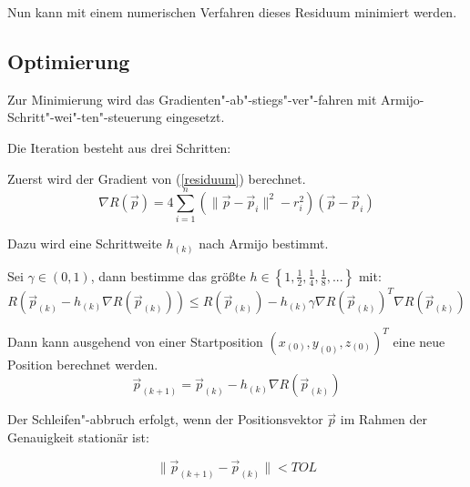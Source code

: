 \documentclass[ngerman,paper=a4,11pt]{scrartcl}
\begin{document}
Nun kann mit einem numerischen Verfahren dieses Residuum minimiert werden.

\subsection{Optimierung}

Zur Minimierung wird das Gradienten"-ab"-stiegs"-ver"-fahren mit Armijo-Schritt"-wei"-ten"-steuerung eingesetzt.


Die Iteration besteht aus drei Schritten:

Zuerst wird der Gradient von (\ref{residuum}) berechnet.
\begin{equation}
\nabla R(\vec{p}) =4 \sum\limits_{i=1}^n \left(\lVert \vec{p}-\vec{p}_i \rVert ^2 - r_i^ 2 \right) (\vec{p}-\vec{p}_i)
\end{equation}

Dazu wird eine Schrittweite $h_{(k)}$ nach Armijo bestimmt.

Sei $\gamma \in (0,1)$, dann bestimme das größte $h \in \left\lbrace1,\frac{1}{2},\frac{1}{4},\frac{1}{8},... \right\rbrace$ 
mit:
\begin{equation}
R\left(\vec{p}_{(k)} - h_{(k)} \nabla R\left(\vec{p}_{(k)}\right)\right) \leq R\left(\vec{p}_{(k)}\right) - h_{(k)} \gamma \nabla R\left(\vec{p}_{(k)}\right)^ T \nabla R\left(\vec{p}_{(k)}\right)
\end{equation}


Dann kann ausgehend von einer Startposition $(x_{(0)},y_{(0)}, z_{(0)})^ T$ eine neue 
Position berechnet werden.
\begin{equation}
\vec{p}_{(k+1)} = \vec{p}_{(k)} - h_{(k)} \nabla R(\vec{p}_{(k)})
\end{equation}

Der Schleifen"-abbruch erfolgt, wenn der Positionsvektor $\vec{p}$ im Rahmen der Genauigkeit stationär ist:

\begin{equation}
\lVert\vec{p}_{(k+1)} - \vec{p}_{(k)}\rVert < TOL
\end{equation}
\end{document}
